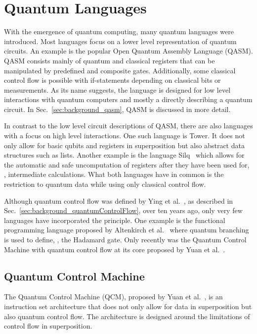 \section{Quantum Languages}
\label{sec:background_quantumLanguages}
With the emergence of quantum computing, many quantum languages were introduced. Most languages focus on a lower level representation of quantum circuits. An example is the popular Open Quantum Assembly Language (QASM)\cite{CBSG17}. QASM consists mainly of quantum and classical registers that can be manipulated by predefined and composite gates. Additionally, some classical control flow is possible with if-statements depending on classical bits or measurements. As its name suggests, the language is designed for low level interactions with quantum computers and mostly a directly describing a quantum circuit. In Sec.~\ref{sec:background_qasm}, QASM is discussed in more detail. 

In contrast to the low level circuit descriptions of QASM, there are also languages with a focus on high level interactions. One such language is Tower\cite{YuCa22}. It does not only allow for basic qubits and registers in superposition but also abstract data structures such as lists. Another example is the language Silq~\cite{BBGV20} which allows for the automatic and safe uncomputation of registers after they have been used for, \eg, intermediate calculations. What both languages have in common is the restriction to quantum data while using only classical control flow. 

Although quantum control flow was defined by Ying et al.~\cite{YYF12}, as described in Sec.~\ref{sec:background_quantumControlFlow}, over ten years ago, only very few languages have incorporated the principle. One example is the functional programming language proposed by Altenkirch et al.~\cite{AlGr05} where quantum branching is used to define, \eg, the Hadamard gate. Only recently was the Quantum Control Machine with quantum control flow at its core proposed by Yuan et al.~\cite{YVC24}. 

\subsection{Quantum Control Machine}
\label{sec:background_quantumControlMachine}
The Quantum Control Machine (QCM), proposed by Yuan et al.~\cite{YVC24}, is an instruction set architecture that does not only allow for data in superposition but also quantum control flow. The architecture is designed around the limitations of control flow in superposition. 

